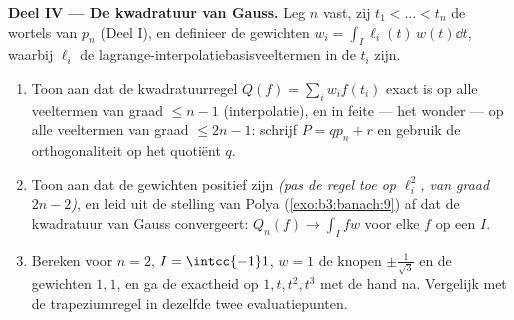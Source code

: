 \begin{problem}
\medskip
\noindent\textbf{Deel IV --- De kwadratuur van Gauss.} Leg $n$
vast, zij $t_1 < \dots < t_n$ de wortels van $p_n$ (Deel I), en
definieer de gewichten $w_i = \int_I \ell_i(t)\,w(t)\dd t$,
waarbij $\ell_i$ de lagrange-interpolatiebasisveeltermen in de
$t_i$ zijn.
\begin{enumerate}[resume]
  \item Toon aan dat de kwadratuurregel $Q(f) = \sum_iw_if(t_i)$
        exact is op alle veeltermen van graad $\leq n - 1$
        (interpolatie), en in feite --- het wonder --- op alle
        veeltermen van graad $\leq 2n - 1$: schrijf $P = qp_n +
        r$ en gebruik de orthogonaliteit op het quotiënt $q$.
  \item Toon aan dat de gewichten positief zijn \emph{(pas de
        regel toe op $\ell_i^2$, van graad $2n - 2$)}, en leid
        uit de stelling van Polya (\cref{exo:b3:banach:9}) af
        dat de kwadratuur van Gauss convergeert: $Q_n(f) \to
        \int_I fw$ voor elke  $f$ op een  $I$.
  \item Bereken voor $n = 2$, $I = \intcc{-1}1$, $w = 1$ de
        knopen $\pm\frac1{\sqrt3}$ en de gewichten $1, 1$, en ga
        de exactheid op $1, t, t^2, t^3$ met de hand na.
        Vergelijk met de trapeziumregel in dezelfde twee
        evaluatiepunten.
\end{enumerate}


\end{problem}
